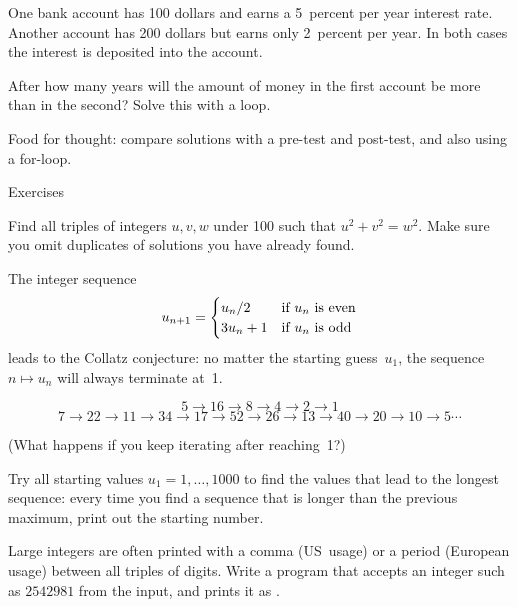 \begin{exercise}
  \label{ex:interest}
  One bank account has 100 dollars and earns a 5~percent per year interest
  rate. Another account has 200 dollars but earns only 2~percent per
  year. In both cases the interest is deposited into the account.
  
  After how many years will the amount of money in the first account
  be more than in the second? Solve this with a  loop.

  Food for thought: compare solutions with a pre-test and post-test,
  and also using a for-loop.
\end{exercise}

 {Exercises}

\begin{exercise}
  \label{ex:pythagoras}
  Find all triples of integers $u,v,w$ under 100 such that
  $u^2+v^2=w^2$. Make sure you omit duplicates of solutions you have
  already found.
\end{exercise}

\begin{exercise}
  \label{ex:collatz}
  The integer sequence
  \[ u_{n+1} = 
  \begin{cases}
    u_n/2&\hbox{if $u_n$ is even}\\
    3u_n+1&\hbox{if $u_n$ is odd}\\
  \end{cases}
  \]
  leads to the Collatz conjecture: no matter the starting guess~$u_1$,
  the sequence $n\mapsto u_n$ will always terminate at~1.

  { \small
  \[ 5\rightarrow 16\rightarrow 8\rightarrow 4\rightarrow 2\rightarrow 1\]
  \[ 7\rightarrow 22\rightarrow 11\rightarrow 34\rightarrow
  17\rightarrow 52\rightarrow 26\rightarrow 13\rightarrow
  40\rightarrow 20\rightarrow 10\rightarrow 5\cdots \]
  }

  (What happens if you keep iterating after reaching~1?)
  
  Try all starting values $u_1=1,\ldots,1000$ to find the values that
  lead to the longest sequence: every time you find a sequence that is
  longer than the previous maximum, print out the starting number.
\end{exercise}

\begin{exercise}
  Large integers are often printed with a comma (US~usage) or a period
  (European usage) between all triples of digits. Write a program that
  accepts an integer such as $2542981$ from the input, and prints it as
  .
\end{exercise}

